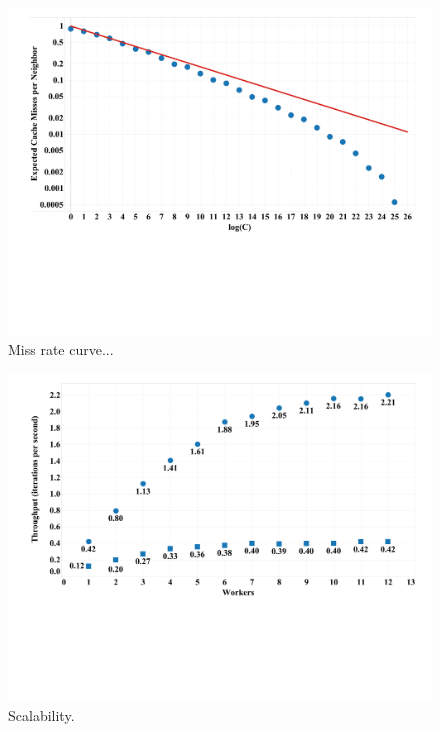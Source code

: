 \begin{figure}[h]
\centering
\includegraphics[width=5in,clip,trim=1cm 6cm 0 0]{figures/miss_rate_curve.pdf}
\caption{Miss rate curve...}
\label{fig:miss_rate_curve}
\end{figure}

\begin{figure}[h]
\centering
\includegraphics[width=5in,clip,trim=1cm 6cm 0 0]{figures/scalability_bsp.pdf}
\caption{Scalability.}
\label{fig:scalability_bsp}
\end{figure}

